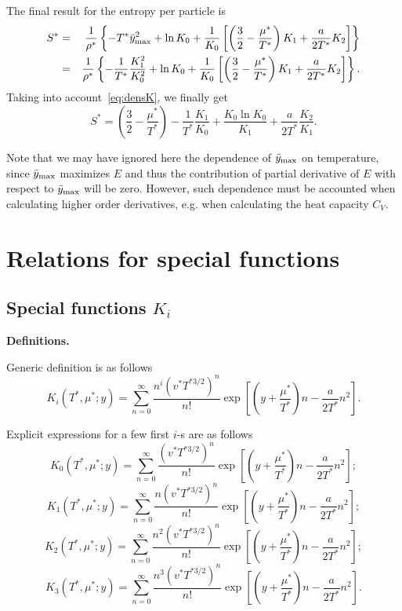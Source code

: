 \documentclass[12pt]{article}
\numberwithin{equation}{section}
\begin{document}
	The final result for the entropy per particle is
	\begin{eqnarray}
		S^{*} & = & \frac{1}{\rho^*} \left\{ -T^* \bar{y}_{\rm max}^2 + \ln K_0 + \frac{1}{K_0} \left[\left(\frac{3}{2} - \frac{\mu^*}{T^*} \right)K_1 + \frac{a}{2 T^*} K_2\right] \right\}
		\\
		& = & \frac{1}{\rho^*} \left\{ -\frac{1}{T^*} \frac{K_1^2}{K_0^2} + \ln K_0 + \frac{1}{K_0} \left[\left(\frac{3}{2} - \frac{\mu^*}{T^*} \right)K_1 + \frac{a}{2 T^*} K_2\right] \right\}.
	\end{eqnarray}
	Taking into account~\eqref{eq:densK}, we finally get
	\begin{equation}
		S^* = \left(\frac{3}{2} - \frac{\mu^*}{T^*}\right) - \frac{1}{T^*}\frac{K_1}{K_0} + \frac{K_0 \ln K_0}{K_1} + \frac{a}{2T^*} \frac{K_2}{K_1}.
	\end{equation}
	
	Note that we may have ignored here the dependence of $\bar{y}_{\rm max}$ on temperature, since $\bar{y}_{\rm max}$ maximizes $E$ and thus the contribution of partial derivative of $E$ with respect to $\bar{y}_{\rm max}$ will be zero. However, such dependence must be accounted when calculating higher order derivatives, e.g. when calculating the heat capacity $C_V$.
	
	\pagebreak
	\section{Relations for special functions}
	\subsection{Special functions $K_i$}
	\textbf{Definitions.}
	
	Generic definition is as follows
	\begin{equation}
		K_i(T^*,\mu^*;y) = \sum_{n=0}^{\infty} \frac{n^i (v^* T^{*3/2})^n}{n!} \exp[\left(y+\frac{\mu^*}{T^*}\right)n - \frac{a}{2T^*}n^2].
	\end{equation}
	
	Explicit expressions for a few first $i$-s are as follows
	\begin{equation}
		K_0(T^*,\mu^*;y) = \sum_{n=0}^{\infty} \frac{(v^* T^{*3/2})^n}{n!} \exp[\left(y+\frac{\mu^*}{T^*}\right)n - \frac{a}{2T^*}n^2];
	\end{equation}
	\begin{equation}
		K_1(T^*,\mu^*;y) = \sum_{n=0}^{\infty} \frac{n(v^* T^{*3/2})^n}{n!} \exp[\left(y+\frac{\mu^*}{T^*}\right)n - \frac{a}{2T^*}n^2];
	\end{equation}
	\begin{equation}
		K_2(T^*,\mu^*;y) = \sum_{n=0}^{\infty} \frac{n^2 (v^* T^{*3/2})^n}{n!} \exp[\left(y+\frac{\mu^*}{T^*}\right)n - \frac{a}{2T^*}n^2];
	\end{equation}
	\begin{equation}
		K_3(T^*,\mu^*;y) = \sum_{n=0}^{\infty} \frac{n^3 (v^* T^{*3/2})^n}{n!} \exp[\left(y+\frac{\mu^*}{T^*}\right)n - \frac{a}{2T^*}n^2].
	\end{equation}
	
\end{document}
